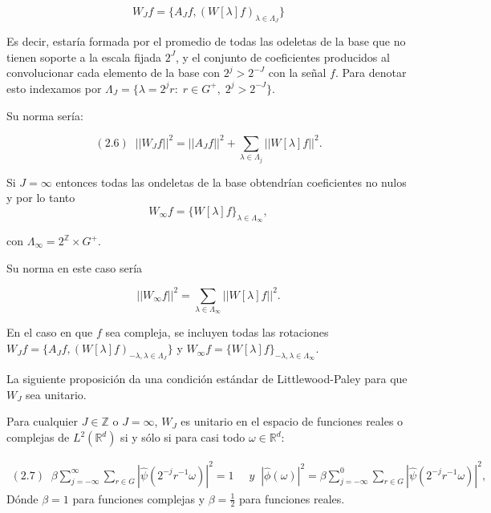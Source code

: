 $$W_J f=\lbrace A_Jf,(W[\lambda]f)_{\lambda \in \Lambda_J} \rbrace$$ 

\noindent Es decir, estaría formada por el promedio de todas las odeletas de la base que no tienen soporte a la escala fijada $2^J$, y el conjunto de coeficientes producidos al convolucionar cada elemento de la base con $2^j>2^{-J}$ con la señal $f$. Para denotar esto indexamos por $\Lambda_J=\lbrace \lambda=2^jr:\;r\in G^{+}, \; 2^j>2^{-J}\rbrace$. 

\medskip

\noindent Su norma sería: 

$$(2.6) \; \; ||W_Jf||^2=||A_Jf||^2+\sum_{\lambda \in \Lambda_j} ||W[\lambda]f||^2.$$

\medskip
 
\noindent Si $J=\infty$ entonces todas las ondeletas de la base obtendrían coeficientes no nulos y por lo tanto 
$$W_\infty f=\lbrace W[\lambda]f\rbrace_{\lambda \in \Lambda_\infty},$$ 

\noindent con $\Lambda_\infty=2^\mathbb{Z} \times G^{+}$. 

\noindent Su norma en este caso sería 

$$||W_\infty f||^2=\sum_{\lambda \in \Lambda_\infty} ||W[\lambda]f||^2.$$

\noindent En el caso en que $f$ sea compleja, se incluyen todas las rotaciones $W_Jf=\lbrace A_J f,(W[\lambda]f)_{-\lambda,\lambda \in \Lambda_J} \rbrace$ y $W_\infty f=\lbrace W[\lambda]f\rbrace_{-\lambda,\lambda \in \Lambda_\infty}$. 

\medskip

\noindent La siguiente proposición da una condición estándar de Littlewood-Paley para que $W_J$ sea unitario.

\begin{proposicion} \label{unitario}
 Para cualquier $J \in \mathbb{Z}$ o $J=\infty$, $W_J$ es unitario en el espacio de funciones reales o complejas de $L^2(\mathbb{R}^d)$ si y sólo si para casi todo $\omega \in \mathbb{R}^d$: 
 
    \begin{align*}
        (2.7) \; \; \beta \sum_{j=-\infty}^\infty \sum_{r \in G} |\widehat{\psi}(2^{-j}r^{-1}\omega)|^2=1 & \; \; y
        \;\;|\widehat{\phi}(\omega)|^2= \beta \sum_{j=-\infty}^0 \sum_{r\in G} |\widehat{\psi}(2^{-j}r^{-1}\omega)|^2,
    \end{align*}
 Dónde $\beta=1$ para funciones complejas y $\beta=\frac{1}{2}$ para funciones reales.
\end{proposicion}

